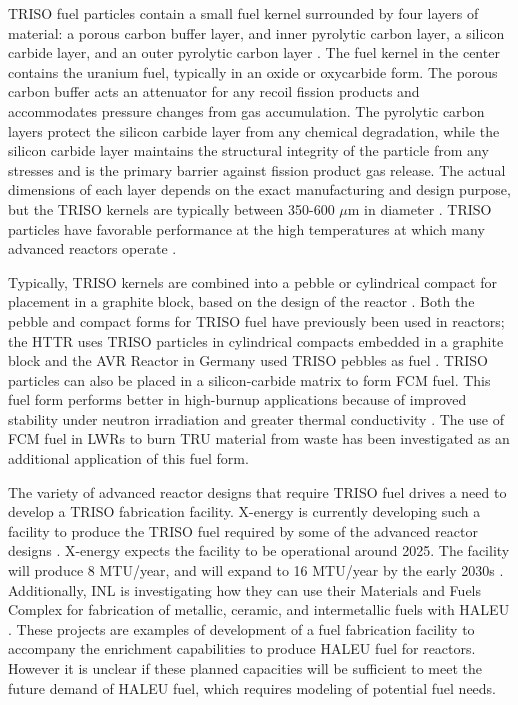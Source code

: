 \gls{TRISO} fuel particles contain 
a small fuel kernel surrounded by four layers of material: a porous carbon 
buffer layer, and inner pyrolytic carbon layer, a silicon carbide layer, 
and an outer pyrolytic carbon layer \cite{demkowicz_coated_2019}. The fuel 
kernel in the center contains the uranium fuel, typically in an oxide 
or oxycarbide form. The porous carbon buffer acts an attenuator for any 
recoil fission products and accommodates pressure changes from gas 
accumulation.
The pyrolytic carbon layers protect the silicon carbide layer from 
any chemical degradation, while the silicon carbide layer maintains the 
structural integrity of the particle from any stresses and is the primary 
barrier against fission product gas release. The actual dimensions 
of each layer depends on the exact manufacturing and design purpose, but 
the \gls{TRISO} kernels are typically between 350-600 $\mu$m in diameter 
\cite{demkowicz_coated_2019}. \gls{TRISO} particles have 
favorable performance at the high temperatures 
at which many advanced reactors operate \cite{demkowicz_coated_2019}. 

Typically, \gls{TRISO} kernels are combined into a pebble or 
cylindrical compact for placement in a graphite block, based on the 
design of the reactor \cite{demkowicz_coated_2019}. Both the 
pebble and compact forms for 
\gls{TRISO} fuel have previously been used in reactors; the \gls{HTTR}
uses 
\gls{TRISO} particles in cylindrical compacts embedded in a graphite block 
\cite{shiozawa_overview_2004} and the AVR Reactor in Germany used 
\gls{TRISO} pebbles as fuel \cite{gottaut_results_1990}.
\gls{TRISO} particles can also be placed in a silicon-carbide matrix 
to form \gls{FCM} fuel. This fuel form performs better in high-burnup 
applications because of improved stability under neutron irradiation and 
greater thermal conductivity \cite{snead_fully_2011}. The use of 
\gls{FCM} fuel in \glspl{LWR} to burn \gls{TRU} material from waste 
has been investigated \cite{snead_fully_2011,venneri_fully_2011} as 
an additional application of this fuel form. 

The variety of advanced reactor designs that require \gls{TRISO} fuel 
drives a need to develop a \gls{TRISO} fabrication facility. 
X-energy is currently developing such a facility to 
produce the \gls{TRISO} fuel required by some of the advanced 
reactor designs \cite{x-energy_triso-x_2022}. X-energy expects the 
facility to be operational around 2025. The facility will 
produce 8 MTU/year, and will expand to 16 MTU/year 
by the early 2030s \cite{x-energy_triso-x_2022}. Additionally,
\gls{INL} is investigating 
how they can use their Materials and Fuels Complex for 
fabrication of metallic, ceramic, and intermetallic fuels with 
\gls{HALEU} \cite{crawford_fuel_2019}. These projects 
are examples of development 
of a fuel fabrication facility to accompany the enrichment 
capabilities to produce \gls{HALEU} fuel for reactors. However
it is unclear if these planned capacities will be sufficient to 
meet the future demand of \gls{HALEU} fuel, which requires 
modeling of potential fuel needs. 

